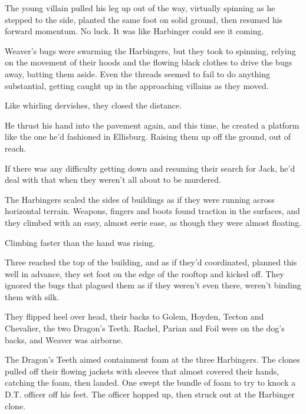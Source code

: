 The young villain pulled his leg up out of the way, virtually spinning as he stepped to the side, planted the same foot on solid ground, then resumed his forward momentum.  No luck.  It was like Harbinger could see it coming.



Weaver's bugs were swarming the Harbingers, but they took to spinning, relying on the movement of their hoods and the flowing black clothes to drive the bugs away, batting them aside.  Even the threads seemed to fail to do anything substantial, getting caught up in the approaching villains as they moved.



Like whirling dervishes, they closed the distance.



He thrust his hand into the pavement again, and this time, he created a platform like the one he'd fashioned in Ellisburg.  Raising them up off the ground, out of reach.



If there was any difficulty getting down and resuming their search for Jack, he'd deal with that when they weren't all about to be murdered.



The Harbingers scaled the sides of buildings as if they were running across horizontal terrain.  Weapons, fingers and boots found traction in the surfaces, and they climbed with an easy, almost eerie ease, as though they were almost floating.



Climbing faster than the hand was rising.



Three reached the top of the building, and as if they'd coordinated, planned this well in advance, they set foot on the edge of the rooftop and kicked off.  They ignored the bugs that plagued them as if they weren't even there, weren't binding them with silk.



They flipped heel over head, their backs to Golem, Hoyden, Tecton and Chevalier, the two Dragon's Teeth.  Rachel, Parian and Foil were on the dog's backs, and Weaver was airborne.



The Dragon's Teeth aimed containment foam at the three Harbingers.  The clones pulled off their flowing jackets with sleeves that almost covered their hands, catching the foam, then landed.  One swept the bundle of foam to try to knock a D.T. officer off his feet.  The officer hopped up, then struck out at the Harbinger clone.



